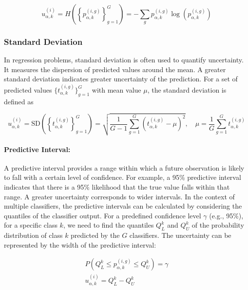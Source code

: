 \documentclass[pdflatex,bst/sn-basic]{bst/sn-jnl}%
\begin{document}
\begin{equation}
u_{\alpha,k}^{(i)}=H\left(\left\{p_{\alpha,k}^{(i,g)}\right\}_{g=1}^{G}\right)=-\sum_{g}{p_{\alpha,k}^{(i,g)} \log\left(p_{\alpha,k}^{(i,g)}\right)}
\label{crowd.Eq.5.uncertainty}
\end{equation}


\subsubsection{Standard Deviation}
In regression problems, standard deviation is often used to quantify uncertainty. It measures the dispersion of predicted values around the mean. A greater standard deviation indicates greater uncertainty of the prediction. For a set of predicted values $ \{t_{\alpha,k}^{(i,g)} \}_{g=1}^G $ with mean value $\mu $, the standard deviation is defined as

\begin{equation}
    u_{\alpha,k}^{(i)}=\text{SD}\left(\left\{t_{\alpha,k}^{(i,g)}\right\}_{g=1}^G\right)=\sqrt {\frac{1}{G-1 }\sum_{g=1}^G\left(t_{\alpha,k}^{(i,g)}-\mu\right)^{2}},\quad\mu=\frac{1}{G}\sum_{g=1}^{G}{t_{\alpha,k}^{(i,g)}}
    \label{crowd.Eq.6.uncertainty.sd}
\end{equation}

\paragraph{Predictive Interval:}
A predictive interval provides a range within which a future observation is likely to fall with a certain level of confidence. For example, a 95\% predictive interval indicates that there is a 95\% likelihood that the true value falls within that range. A greater uncertainty corresponds to wider intervals. In the context of multiple classifiers, the predictive intervals can be calculated by considering the quantiles  of the classifier output. For a predefined confidence level $\gamma $ (e.g., 95\%), for a specific class $k $, we need to find the quantiles $Q_{L}^{k} $ and $Q_{U}^{k} $ of the probability distribution of class $k $ predicted by the $G $ classifiers. The uncertainty can be represented by the width of the predictive interval:

\begin{equation}
    \begin{aligned}
        P\left(Q_L^{k} \leq p_{\alpha,k}^{(i,g)} \leq Q_U^{k}\right) = \gamma
        \\
        u_{\alpha,k}^{(i)} = Q_L^{k} - Q_U^{k}
    \end{aligned}
    \label{crowd.Eq.uncertainty}
\end{equation}
\end{document}
